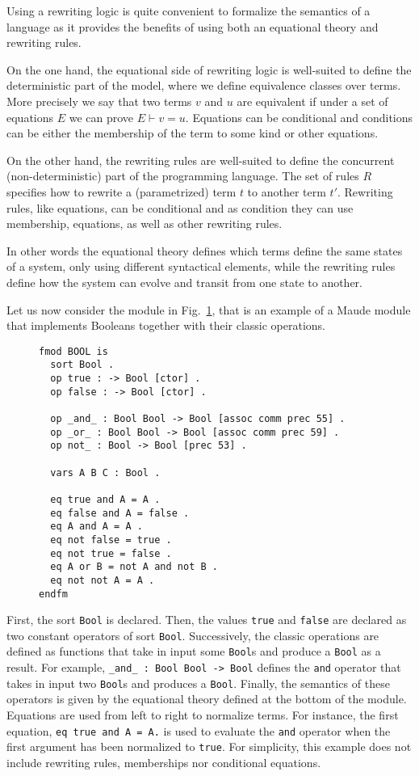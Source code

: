 \documentclass{article}[12pt,a4paper]
\theoremstyle{definition}
\begin{document}
Using a rewriting logic is quite convenient to formalize the
semantics of a language as it provides the benefits of using both an equational theory and rewriting rules.

On the one hand, the equational side of rewriting logic is well-suited to define the deterministic part of the model, where
we define equivalence classes over terms. More precisely we say that two terms
$v$ and $u$ are equivalent if under a set of equations $E$ we can prove $E \vdash
v = u$. Equations can be conditional and conditions can be either the
membership of the term to some kind or other equations.

On the other hand, the rewriting rules are well-suited to define the concurrent
(non-deterministic) part of the programming language. The set of rules $R$
specifies how to rewrite a (parametrized) term $t$ to another term $t'$.
Rewriting rules, like equations, can be conditional and as condition they can
use membership, equations, as well as other rewriting rules.

In other words the equational theory defines which terms define the same states
of a system, only using different syntactical elements, while the rewriting rules
define how the system can evolve and transit from one state to another.

Let us now consider the module in Fig.~\ref{fig:bool}, that is an example of a Maude module that implements Booleans together with their classic operations.

\begin{figure}[t]
\begin{verbatim}
fmod BOOL is
  sort Bool .
  op true : -> Bool [ctor] .
  op false : -> Bool [ctor] .

  op _and_ : Bool Bool -> Bool [assoc comm prec 55] .
  op _or_ : Bool Bool -> Bool [assoc comm prec 59] .
  op not_ : Bool -> Bool [prec 53] .

  vars A B C : Bool .

  eq true and A = A .
  eq false and A = false .
  eq A and A = A .
  eq not false = true .
  eq not true = false .
  eq A or B = not A and not B .
  eq not not A = A .
endfm
\end{verbatim}
  \label{fig:bool}
\end{figure}

First, the sort \verb+Bool+ is declared. Then, the values \verb+true+ and \verb+false+ are declared
as two constant operators of sort \verb+Bool+. Successively, the classic operations are
defined as functions that take in input some \verb+Bool+s and produce a \verb+Bool+ as a
result. For example, \verb+_and_ : Bool Bool -> Bool+ defines the \verb+and+
operator that takes in input two \verb+Bool+s and produces a \verb+Bool+. Finally, the semantics of these operators is given
by the equational theory defined at the bottom of the module. Equations are used
from left to right to normalize terms. For instance, the first equation,
\verb+eq true and A = A.+ is used to evaluate the \verb+and+ operator when the first
argument has been normalized to \verb+true+. For simplicity, this example does not include rewriting rules, memberships nor conditional equations.
\end{document}
